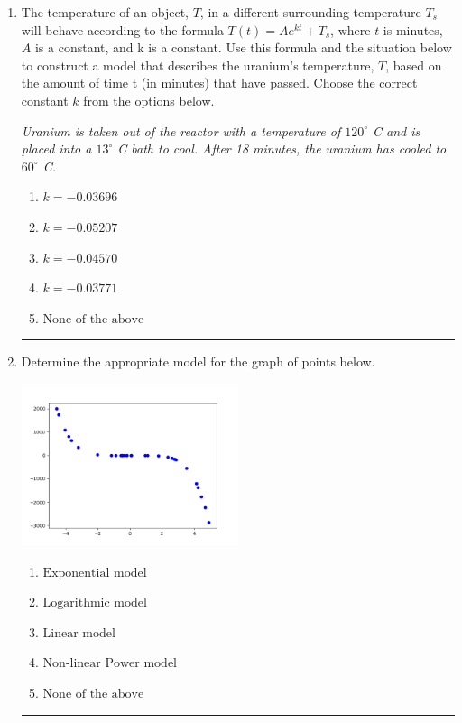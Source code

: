 \documentclass[14pt]{extbook}
\newcommand{\litem}[1]{\item#1\hspace*{-1cm}\rule{\textwidth}{0.4pt}}
\begin{document}
\begin{enumerate}
{\begin{enumerate}[label=\Alph*.]
\end{enumerate} }
\litem{
The temperature of an object, $T$, in a different surrounding temperature $T_s$ will behave according to the formula $T(t) = Ae^{kt} + T_s$, where $t$ is minutes, $A$ is a constant, and k is a constant. Use this formula and the situation below to construct a model that describes the uranium's temperature, $T$, based on the amount of time t (in minutes) that have passed. Choose the correct constant $k$ from the options below.
\begin{center}
    \textit{ Uranium is taken out of the reactor with a temperature of $120^{\circ}$ C and is placed into a $13^{\circ}$ C bath to cool. After 18 minutes, the uranium has cooled to $60^{\circ}$ C. }
\end{center}
\begin{enumerate}[label=\Alph*.]
\item \( k = -0.03696 \)
\item \( k = -0.05207 \)
\item \( k = -0.04570 \)
\item \( k = -0.03771 \)
\item \( \text{None of the above} \)

\end{enumerate} }
\litem{
Determine the appropriate model for the graph of points below.
\begin{center}
    \includegraphics[width=0.5\textwidth]{../Figures/identifyModelGraph12B.png}
\end{center}
\begin{enumerate}[label=\Alph*.]
\item \( \text{Exponential model} \)
\item \( \text{Logarithmic model} \)
\item \( \text{Linear model} \)
\item \( \text{Non-linear Power model} \)
\item \( \text{None of the above} \)


\end{enumerate}}
\end{enumerate}
\end{document}

